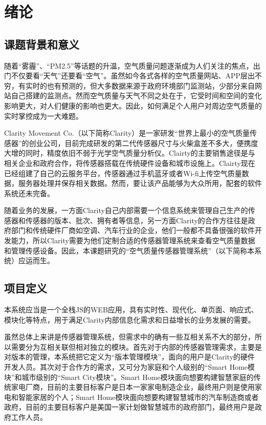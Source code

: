
\chapter{绪论}
\label{chap:intro}
\section{课题背景和意义}
随着“雾霾”、“PM2.5”等话题的升温，空气质量问题逐渐成为人们关注的焦点，出门不仅要看“天气”还要看“空气”。虽然如今各式各样的空气质量网站、APP层出不穷，有实时的也有预测的，但大多数据来源于政府环境部门监测站，少部分来自网站自己搭建的监测点。然而空气质量与天气不同之处在于，它受时间和空间的变化影响更大，对人们健康的影响也更大。因此，如何满足个人用户对周边空气质量的实时掌控成为一大难题。

Clarity Movement Co.（以下简称Clarity）是一家研发“世界上最小的空气质量传感器”的创业公司，目前完成研发的第二代传感器尺寸与火柴盒差不多大，便携度大增的同时，精度依旧不弱于光学空气质量分析仪。Clairty的主要销售途径是与相关企业和政府合作，将传感器搭载在传统硬件设备和城市设施上。Clairty现在已经组建了自己的云服务平台，传感器通过手机蓝牙或者Wi-fi上传空气质量数据，服务器处理并保存相关数据。然而，要让该产品能够为大众所用，配套的软件系统还未完备。

随着业务的发展，一方面Clarity自己内部需要一个信息系统来管理自己生产的传感器和传感器的版本、批次、拥有者等信息，另一方面Clarity的合作方往往是政府部门和传统硬件厂商如空调、汽车行业的企业，他们一般都不具备很强的软件开发能力，所以Clarity需要为他们定制合适的传感器管理系统来查看空气质量数据和管理传感设备。因此，本课题研究的“空气质量传感器管理系统”（以下简称本系统）应运而生。

\section{项目定义}
本系统应当是一个全栈JS的WEB应用，具有实时性、现代化、单页面、响应式、模块化等特点，用于满足Clarity内部信息化需求和日益增长的业务发展的需要。

虽然总体上来讲是传感器管理系统，但需求中的确有一些互相关系不大的部分，所以需要分为互相关联但相对独立的模块。首先对于内部的传感器管理需求，主要是对版本的管理，本系统把它定义为“版本管理模块”，面向的用户是Clarity的硬件开发人员。其次对于合作方的需求，又可分为家庭和个人级别的“Smart Home模块”和城市级别的“Smart City模块”。Smart Home模块面向想要构建智慧家庭的传统家电厂商，目前的主要目标客户是日本一家家电制造企业，最终用户则是使用家电和智能家居的个人；Smart Home模块面向想要构建智慧城市的汽车制造商或者政府，目前的主要目标客户是美国一家计划做智慧城市的政府部门，最终用户是政府工作人员。

